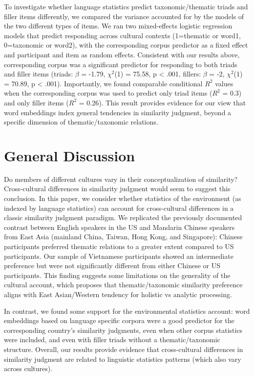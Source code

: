\documentclass[10pt, letterpaper]{article}
\begin{document}
To investigate whether language statistics predict taxonomic/thematic
triads and filler items differently, we compared the variance accounted
for by the models of the two different types of items. We ran two
mixed-effects logistic regression models that predict responding across
cultural contexts (1=thematic or word1, 0=taxonomic or word2), with the
corresponding corpus predictor as a fixed effect and participant and
item as random effects. Consistent with our results above, corresponding
corpus was a significant predictor for responding to both triads and
filler items (triads: \(\beta\) = -1.79, \(\chi^2\)(1) = 75.58, p
\textless{} .001, fillers: \(\beta\) = -2, \(\chi^2\)(1) = 70.89, p
\textless{} .001). Importantly, we found comparable conditional \(R^2\)
values when the corresponding corpus was used to predict only triad
items (\(R^2\) = 0.3) and only filler items (\(R^2\) = 0.26). This
result provides evidence for our view that word embeddings index general
tendencies in similarity judgment, beyond a specific dimension of
thematic/taxonomic relations.

\hypertarget{general-discussion}{%
\section{General Discussion}\label{general-discussion}}

Do members of different cultures vary in their conceptualization of
similarity? Cross-cultural differences in similarity judgment would seem
to suggest this conclusion. In this paper, we consider whether
statistics of the environment (as indexed by language statistics) can
account for cross-cultural differences in a classic similarity judgment
paradigm. We replicated the previously documented contrast between
English speakers in the US and Mandarin Chinese speakers from East Asia
(mainland China, Taiwan, Hong Kong, and Singapore): Chinese participants
preferred thematic relations to a greater extent compared to US
participants. Our sample of Vietnamese participants showed an
intermediate preference but were not significantly different from either
Chinese or US participants. This finding suggests some limitations on
the generality of the cultural account, which proposes that
thematic/taxonomic similarity preference aligns with East Asian/Western
tendency for holistic vs analytic processing.

In contrast, we found some support for the environmental statistics
account: word embeddings based on language specific corpora were a good
predictor for the corresponding country's similarity judgments, even
when other corpus statistics were included, and even with filler triads
without a thematic/taxonomic structure. Overall, our results provide
evidence that cross-cultural differences in similarity judgment are
related to linguistic statistics patterns (which also vary across
cultures).
\end{document}
